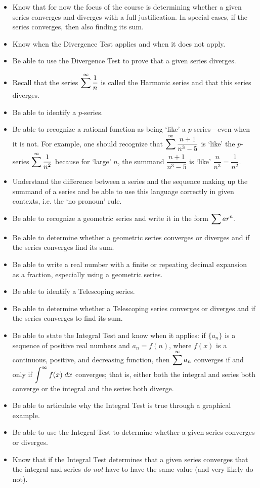 \documentclass[11pt,letterpaper]{article}
\begin{document}
\begin{itemize}
\item Know that for now the focus of the course is determining whether a given series converges and diverges with a full justification. In special cases, if the series converges, then also finding its sum.
\item Know when the Divergence Test applies and when it does not apply.
\item Be able to use the Divergence Test to prove that a given series diverges.
\item Recall that the series $\displaystyle\sum^\infty \dfrac{1}{n}$ is called the Harmonic series and that this series diverges. 
\item Be able to identify a $p$-series.
\item Be able to recognize a rational function as being `like' a $p$-series---even when it is not. For example, one should recognize that $\displaystyle\sum^\infty \dfrac{n + 1}{n^3 - 5}$ is `like' the $p$-series $\displaystyle\sum^\infty \dfrac{1}{n^2}$ because for `large' $n$, the summand $\dfrac{n + 1}{n^3 - 5}$ is `like' $\dfrac{n}{n^3}= \dfrac{1}{n^2}$.
\item Understand the difference between a series and the sequence making up the summand of a series and be able to use this language correctly in given contexts, i.e. the `no pronoun' rule.
\item Be able to recognize a geometric series and write it in the form $\displaystyle\sum a r^n$. 
\item Be able to determine whether a geometric series converges or diverges and if the series converges find its sum.
\item Be able to write a real number with a finite or repeating decimal expansion as a fraction, especially using a geometric series. 
\item Be able to identify a Telescoping series. 
\item Be able to determine whether a Telescoping series converges or diverges and if the series converges to find its sum. 
\item Be able to state the Integral Test and know when it applies: if $\{a _n \}$ is a sequence of positive real numbers and $a_n= f(n)$, where $f(x)$ is a continuous, positive, and decreasing function, then $\displaystyle\sum^\infty a_n$ converges if and only if $\displaystyle\int^\infty f(x) \;dx$ converges; that is, either both the integral and series both converge or the integral and the series both diverge. 
\item Be able to articulate why the Integral Test is true through a graphical example. 
\item Be able to use the Integral Test to determine whether a given series converges or diverges.
\item Know that if the Integral Test determines that a given series converges that the integral and series \textit{do not} have to have the same value (and very likely do not). 
\end{itemize}
\end{document}
